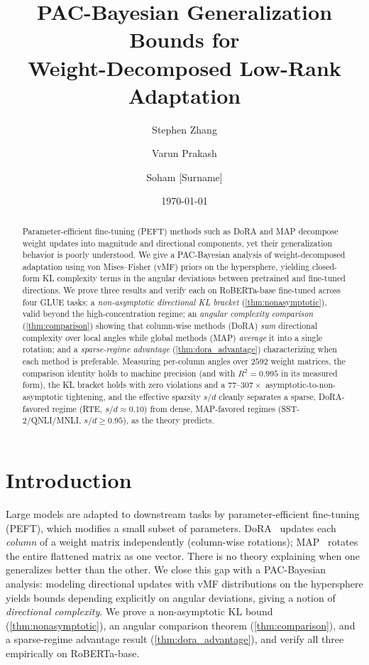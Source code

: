 \documentclass[11pt]{article}
\title{\textbf{PAC-Bayesian Generalization Bounds for\\
Weight-Decomposed Low-Rank Adaptation}}
\author{Stephen Zhang \and Varun Prakash \and Soham [Surname]}
\date{\today}
\begin{document}
\maketitle
\vspace{-1.5em}

\begin{abstract}
\small
Parameter-efficient fine-tuning (PEFT) methods such as DoRA and MAP decompose weight
updates into magnitude and directional components, yet their generalization behavior
is poorly understood. We give a PAC-Bayesian analysis of weight-decomposed adaptation
using von Mises--Fisher (vMF) priors on the hypersphere, yielding closed-form KL
complexity terms in the angular deviations between pretrained and fine-tuned
directions. We prove three results and verify each on RoBERTa-base fine-tuned across
four GLUE tasks: a \emph{non-asymptotic directional KL bracket}
(\cref{thm:nonasymptotic}), valid beyond the high-concentration regime; an
\emph{angular complexity comparison} (\cref{thm:comparison}) showing that column-wise
methods (DoRA) \emph{sum} directional complexity over local angles while global
methods (MAP) \emph{average} it into a single rotation; and a \emph{sparse-regime
advantage} (\cref{thm:dora_advantage}) characterizing when each method is preferable.
Measuring per-column angles over $2592$ weight matrices, the comparison identity holds
to machine precision (and with $R^2{=}0.995$ in its measured form), the KL bracket
holds with zero violations and a $77$--$307\times$ asymptotic-to-non-asymptotic
tightening, and the effective sparsity $s/d$ cleanly separates a sparse,
DoRA-favored regime (RTE, $s/d{\approx}0.10$) from dense, MAP-favored regimes
(SST-2/QNLI/MNLI, $s/d{\ge}0.95$), as the theory predicts.
\end{abstract}

\section{Introduction}
Large models are adapted to downstream tasks by parameter-efficient fine-tuning
(PEFT), which modifies a small subset of parameters. DoRA~\cite{liu2024dora} updates
each \emph{column} of a weight matrix independently (column-wise rotations); MAP~\cite{si2025map}
rotates the entire flattened matrix as one vector. There is no theory explaining when
one generalizes better than the other. We close this gap with a PAC-Bayesian analysis:
modeling directional updates with vMF distributions on the hypersphere yields bounds
depending explicitly on angular deviations, giving a notion of \emph{directional
complexity}. We prove a non-asymptotic KL bound (\cref{thm:nonasymptotic}), an
angular comparison theorem (\cref{thm:comparison}), and a sparse-regime advantage
result (\cref{thm:dora_advantage}), and verify all three empirically on RoBERTa-base.
\end{document}
